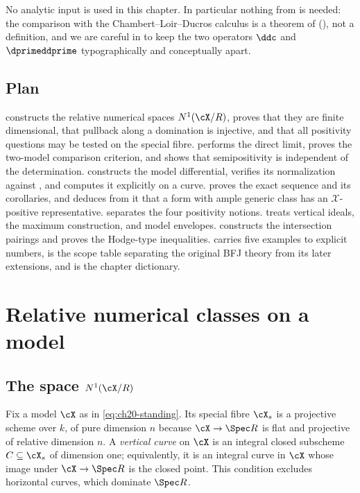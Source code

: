 No analytic input is used in this chapter.  In particular nothing from
 is needed: the comparison with the Chambert--Loir--Ducros
calculus is a theorem of 
(), not a definition, and we are careful in
 to keep the two operators $\ddc$ and
$\dprimeddprime$ typographically and conceptually apart.

\subsection{Plan}
\label{sec:ch20-plan}

 constructs the relative numerical spaces
$N^1(\cX/R)$, proves that they are finite dimensional, that pullback along
a domination is injective, and that all positivity questions may be tested
on the special fibre.   performs the direct
limit, proves the two-model comparison criterion, and shows that
semipositivity is independent of the determination.
 constructs the model differential, verifies its
normalization against , and computes it explicitly
on a curve.   proves the exact sequence and its
corollaries, and  deduces from it
that a form with ample generic class has an $\mathcal X$-positive
representative.   separates the four positivity
notions.   treats vertical ideals, the maximum
construction, and model envelopes.   constructs
the intersection pairings and proves the Hodge-type inequalities.
 carries five examples to explicit numbers,
 is the scope table separating the original BFJ theory
from its later extensions, and  is the chapter
dictionary.

\section{Relative numerical classes on a model}
\label{sec:ch20-numerical}

\subsection{The space \texorpdfstring{$N^1(\cX/R)$}{N1(X/R)}}
\label{sec:ch20-n1}

Fix a model $\cX$ as in \eqref{eq:ch20-standing}.  Its special fibre
$\cX_s$ is a projective scheme over $k$, of pure dimension $n$ because
$\cX\to\Spec R$ is flat and projective of relative dimension $n$.  A
\emph{vertical curve} on $\cX$ is an integral closed subscheme
$C\subseteq\cX_s$ of dimension one; equivalently, it is an integral curve
in $\cX$ whose image under $\cX\to\Spec R$ is the closed point.  This
condition excludes horizontal curves, which dominate $\Spec R$.

